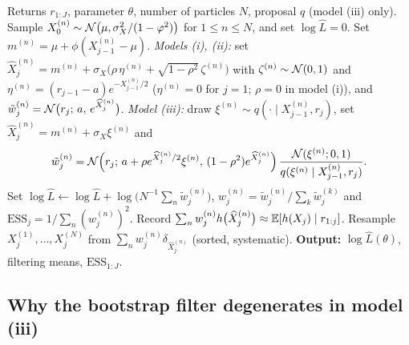 \begin{algorithm}[t]
\caption{Particle filter for models (i)--(iii)}
\label{alg:pf}
\begin{algorithmic}[1]
\REQUIRE Returns $r_{1:J}$, parameter $\theta$, number of particles $N$, proposal $q$ (model (iii) only).
\STATE Sample $X_0^{(n)} \sim \mathcal{N}\big(\mu, \sigma_X^2/(1-\varphi^2)\big)$ for $1 \le n \le N$, and set $\log\hat L = 0$.
        \STATE Set $m^{(n)} = \mu + \phi(X_{j-1}^{(n)} - \mu)$.
        \STATE \emph{Models (i), (ii):} set $\widehat X_j^{(n)} = m^{(n)} + \sigma_X\big(\rho\,\eta^{(n)} + \sqrt{1-\rho^2}\,\zeta^{(n)}\big)$ with $\zeta^{(n)} \sim \mathcal{N}(0,1)$ and $\eta^{(n)} = (r_{j-1} - a)e^{-X_{j-1}^{(n)}/2}$ ($\eta^{(n)} = 0$ for $j = 1$; $\rho = 0$ in model (i)), and $\tilde w_j^{(n)} = \mathcal{N}\big(r_j;\, a,\, e^{\widehat X_j^{(n)}}\big)$.
        \STATE \emph{Model (iii):} draw $\xi^{(n)} \sim q(\cdot \mid X_{j-1}^{(n)}, r_j)$, set $\widehat X_j^{(n)} = m^{(n)} + \sigma_X\xi^{(n)}$ and
        \[
                \tilde w_j^{(n)} = \mathcal{N}\Big(r_j;\, a + \rho e^{\widehat X_j^{(n)}/2}\xi^{(n)},\, (1-\rho^2)e^{\widehat X_j^{(n)}}\Big)\,
                \frac{\mathcal{N}(\xi^{(n)}; 0, 1)}{q(\xi^{(n)} \mid X_{j-1}^{(n)}, r_j)}.
        \]
    \ENDFOR
    \STATE Set $\log\hat L \leftarrow \log\hat L + \log\big(N^{-1}\sum_n \tilde w_j^{(n)}\big)$, $w_j^{(n)} = \tilde w_j^{(n)}/\sum_k \tilde w_j^{(k)}$ and $\mathrm{ESS}_j = 1/\sum_n (w_j^{(n)})^2$.
    \STATE Record $\sum_n w_j^{(n)} h\big(\widehat X_j^{(n)}\big) \approx \operatorname{\mathbb{E}}[h(X_j) \mid r_{1:j}]$.
    \STATE Resample $X_j^{(1)}, \dots, X_j^{(N)}$ from $\sum_n w_j^{(n)}\delta_{\widehat X_j^{(n)}}$ (sorted, systematic).
\ENDFOR
\STATE \textbf{Output:} $\log\hat L(\theta)$, filtering means, $\mathrm{ESS}_{1:J}$.
\end{algorithmic}
\end{algorithm}

\subsection{Why the bootstrap filter degenerates in model (iii)}

